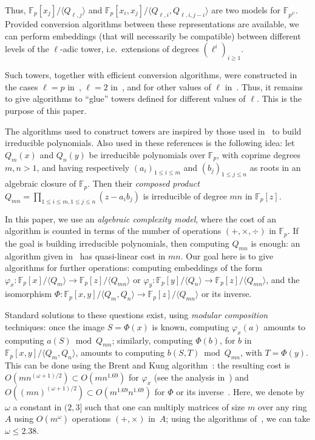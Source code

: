 \documentclass{sig-alternate}
\def\F {\ensuremath{\mathbb{F}}}
\newcounter{algo}
\newcommand{\ang}[1]{\langle#1\rangle}
\begin{document}
Thus, $\F_p[x_j]/\ang{Q_{\ell,j}}$ and
$\F_p[x_i,x_j]/\ang{Q_{\ell,i},Q_{\ell,i,j-i}}$ are two models for
$\F_{p^{\ell^j}}$. Provided conversion algorithms between these
representations are available, we can perform embeddings (that will
necessarily be compatible) between different levels of the $\ell$-adic
tower, i.e.\ extensions of degrees $(\ell^i)_{i \ge 1}$.

Such towers, together with efficient conversion algorithms, were
constructed in the cases $\ell = p$
in~\cite{cantor89,couveignes00,df+schost12}, $\ell=2$
in~\cite{DoSc12}, and for other values of $\ell$ in~\cite{DeDoSc13}.
Thus, it remains to give algorithms to ``glue'' towers defined for
different values of $\ell$. This is the purpose of this paper.

\smallskip{} The algorithms used
to construct towers are inspired by those used
in~\cite{Shoup90,shoup94,couveignes+lercier11} to build irreducible
polynomials. Also used in these references is the following idea: let
$Q_m(x)$ and $Q_n(y)$ be irreducible polynomials over $\F_p$, with
coprime degrees $m,n>1$, and having respectively $(a_i)_{1 \le i
  \le m}$ and $(b_j)_{1 \le j \le n}$ as roots in an algebraic closure
of $\F_p$. Then their {\em composed product} $Q_{mn} = \prod_{1 \le i
  \le m, 1 \le j \le n} (z- a_i b_j)$ is irreducible of degree $mn$ in
$\F_p[z]$.

In this paper, we use an {\em algebraic complexity model}, where the
cost of an algorithm is counted in terms of the number of operations
$(+,\times,\div)$ in $\F_p$.  If the goal is building irreducible
polynomials, then computing $Q_{mn}$ is enough: an algorithm given
in~\cite{BoFlSaSc06} has quasi-linear cost in $mn$. Our goal here is
to give algorithms for further operations: computing embeddings of the
form $\varphi_x: \F_p[x]/\ang{Q_m}\to \F_p[z]/\ang{Q_{mn}}$ or
$\varphi_y: \F_p[y]/\ang{Q_n}\to \F_p[z]/\ang{Q_{mn}}$, and the
isomorphism $\Phi: \F_p[x,y]/\ang{Q_m,Q_n}\to \F_p[z]/\ang{Q_{mn}}$ or
its inverse.

Standard solutions to these questions exist, using {\em modular
  composition} techniques: once the image $S=\Phi(x)$ is known,
computing $\varphi_x(a)$ amounts to computing $a(S) \bmod Q_{mn}$;
similarly, computing $\Phi(b)$, for $b$ in $\F_p[x,y]/\ang{Q_m,Q_n}$,
amounts to computing $b(S,T) \bmod Q_{mn}$, with $T=\Phi(y)$.  This
can be done using the Brent and Kung algorithm~\cite{brent+kung}: the
resulting cost is $O(m n^{(\omega+1)/2}) \subset O(m n^{1.69})$ for
$\varphi_x$ (see the analysis in~\cite{shoup94}) and $O((m
n)^{(\omega+1)/2}) \subset O(m^{1.69} n^{1.69})$ for $\Phi$ or its
inverse~\cite{PoSc13b}. Here, we denote by $\omega$ a constant in
$(2,3]$ such that one can multiply matrices of size $m$ over any ring
  $A$ using $O(m^\omega)$ operations $(+,\times)$ in~$A$; using the
  algorithms of~\cite{coppersmith+winograd,Williams12}, we can take
  $\omega \le 2.38$.
\end{document}
